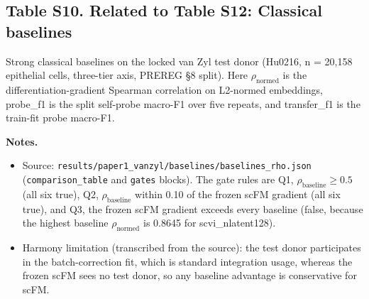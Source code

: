 \documentclass[12pt,a4paper]{article}
\begin{document}
\subsection*{Table S10. Related to Table S12: Classical baselines}
\label{tab:S10}

Strong classical baselines on the locked van Zyl test donor (Hu0216, n = 20,158 epithelial cells, three-tier axis, PREREG \S8 split). Here $\rho_{\text{normed}}$ is the differentiation-gradient Spearman correlation on L2-normed embeddings, probe\_f1 is the split self-probe macro-F1 over five repeats, and transfer\_f1 is the train-fit probe macro-F1.

\medskip
\begingroup
\small
\centering
{}
\endgroup

\textbf{Notes.}
\begin{itemize}
  \item Source: \texttt{results/paper1\_vanzyl/baselines/baselines\_rho.json} (\texttt{comparison\_table} and \texttt{gates} blocks). The gate rules are Q1, $\rho_{\text{baseline}} \ge 0.5$ (all six true), Q2, $\rho_{\text{baseline}}$ within 0.10 of the frozen scFM gradient (all six true), and Q3, the frozen scFM gradient exceeds every baseline (false, because the highest baseline $\rho_{\text{normed}}$ is 0.8645 for scvi\_nlatent128).
  \item Harmony limitation (transcribed from the source): the test donor participates in the batch-correction fit, which is standard integration usage, whereas the frozen scFM sees no test donor, so any baseline advantage is conservative for scFM.
\end{itemize}
\end{document}
